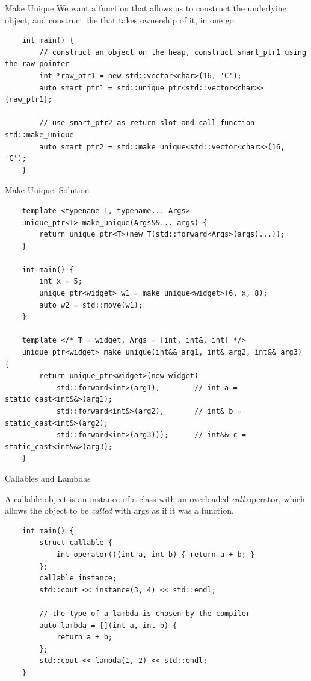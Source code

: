 \begin{frame}[fragile]{Make Unique}
  We want a function that allows us to construct the underlying object,
  and construct the  that takes ownership of it, in one go.

  \begin{verbatim}
    int main() {
        // construct an object on the heap, construct smart_ptr1 using the raw pointer
        int *raw_ptr1 = new std::vector<char>(16, 'C'); 
        auto smart_ptr1 = std::unique_ptr<std::vector<char>>{raw_ptr1};

        // use smart_ptr2 as return slot and call function std::make_unique
        auto smart_ptr2 = std::make_unique<std::vector<char>>(16, 'C');
    }
  \end{verbatim}
\end{frame}

\begin{frame}[fragile]{Make Unique: Solution}
  \begin{verbatim}
    template <typename T, typename... Args>
    unique_ptr<T> make_unique(Args&&... args) {
        return unique_ptr<T>(new T(std::forward<Args>(args)...));
    }

    int main() {
        int x = 5;
        unique_ptr<widget> w1 = make_unique<widget>(6, x, 8);
        auto w2 = std::move(w1);
    }

    template </* T = widget, Args = [int, int&, int] */> 
    unique_ptr<widget> make_unique(int&& arg1, int& arg2, int&& arg3) {
        return unique_ptr<widget>(new widget(
            std::forward<int>(arg1),        // int a = static_cast<int&&>(arg1);
            std::forward<int&>(arg2),       // int& b = static_cast<int&>(arg2);
            std::forward<int>(arg3)));      // int&& c = static_cast<int&&>(arg3);
    }
  \end{verbatim}
\end{frame}

\begin{frame}[fragile]{Callables and Lambdas}
  \begin{sqt:definition}
    A callable object is an instance of a class with an overloaded \emph{call} operator,
    which allows the object to be \emph{called} with args as if it was a function.
  \end{sqt:definition}
  \begin{verbatim}
    int main() {
        struct callable {
            int operator()(int a, int b) { return a + b; }
        };
        callable instance;
        std::cout << instance(3, 4) << std::endl;

        // the type of a lambda is chosen by the compiler
        auto lambda = [](int a, int b) {
            return a + b;
        };
        std::cout << lambda(1, 2) << std::endl;
    }
  \end{verbatim}
\end{frame}

